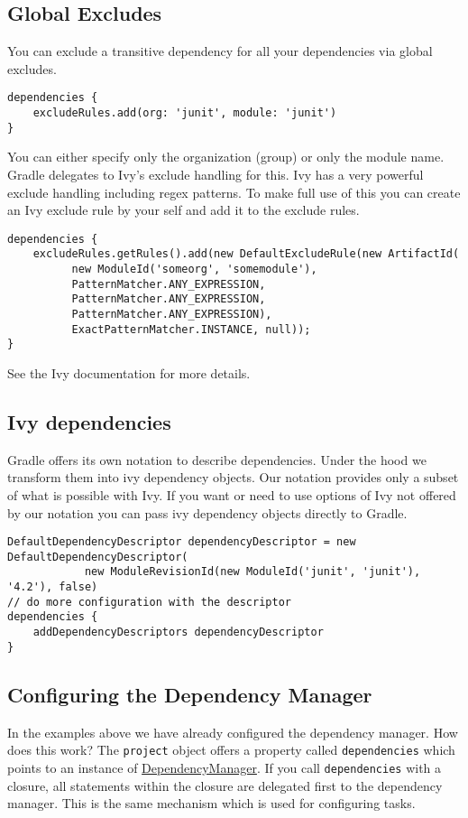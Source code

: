 \subsection{Global Excludes} %
\label{sub:global_excludes}
You can exclude a transitive dependency for all your dependencies via global excludes.
\begin{Verbatim}
dependencies {
    excludeRules.add(org: 'junit', module: 'junit')
}
\end{Verbatim}
You can either specify only the organization (group) or only the module name. Gradle delegates to Ivy's exclude handling
for this. Ivy has a very powerful exclude handling including regex patterns. To make full use of this you can create an Ivy exclude rule by your self and add it to the exclude rules.
\begin{Verbatim}
dependencies {
    excludeRules.getRules().add(new DefaultExcludeRule(new ArtifactId(
          new ModuleId('someorg', 'somemodule'), 
		  PatternMatcher.ANY_EXPRESSION,
          PatternMatcher.ANY_EXPRESSION,
          PatternMatcher.ANY_EXPRESSION),
          ExactPatternMatcher.INSTANCE, null));
}
\end{Verbatim}
See the Ivy documentation for more details. 

\subsection{Ivy dependencies} %
\label{sub:ivy_dependencies}
Gradle offers its own notation to describe dependencies. Under the hood we transform them into ivy dependency objects. Our notation provides only a subset of what is possible with Ivy. If you want or need to use options of Ivy not offered by our notation you can pass ivy dependency objects directly to Gradle.
\begin{Verbatim}
DefaultDependencyDescriptor dependencyDescriptor = new DefaultDependencyDescriptor(
	        new ModuleRevisionId(new ModuleId('junit', 'junit'), '4.2'), false)
// do more configuration with the descriptor
dependencies {
	addDependencyDescriptors dependencyDescriptor
}
\end{Verbatim}

\subsection{Configuring the Dependency Manager} %
\label{sub:configuring_the_dependency_manager}
In the examples above we have already configured the dependency manager. How does this work? The \texttt{project} object offers a property called \texttt{dependencies} which points to an instance of \href{\API DepencencyManager.html}{\PKG DependencyManager}. If you call \texttt{dependencies} with a closure, all statements within the closure are delegated first to the dependency manager. This is the same mechanism which is used for configuring tasks.

